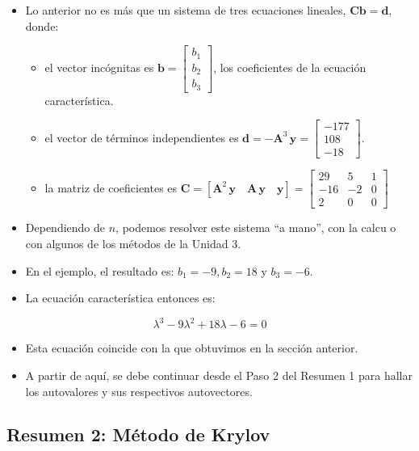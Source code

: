 \documentclass[openany]{book}
\providecommand{\tightlist}{%
  \setlength{\itemsep}{0pt}\setlength{\parskip}{0pt}}
\begin{document}
\begin{itemize}
\item
  Lo anterior no es más que un sistema de tres ecuaciones lineales, \(\mathbf{Cb=d}\), donde:

  \begin{itemize}
  \tightlist
  \item
    el vector incógnitas es \(\mathbf{b} = \begin{bmatrix} b_1 \\ b_2 \\ b_3 \end{bmatrix}\), los coeficientes de la ecuación característica.
  \item
    el vector de términos independientes es \(\mathbf{d} = - \mathbf{A}^3 \, \mathbf{y} = \begin{bmatrix} -177 \\ 108 \\ -18 \end{bmatrix}\).
  \item
    la matriz de coeficientes es \(\mathbf{C} = [\mathbf{A}^{2} \, \mathbf{y} \quad \mathbf{A} \, \mathbf{y} \quad \mathbf{y}] = \begin{bmatrix} 29 & 5 & 1 \\ -16 & -2 & 0 \\2 & 0 & 0 \end{bmatrix}\)
  \end{itemize}
\item
  Dependiendo de \(n\), podemos resolver este sistema ``a mano'', con la calcu o con algunos de los métodos de la Unidad 3.
\item
  En el ejemplo, el resultado es: \(b_1 = -9, b_2 = 18\) y \(b_3 = -6\).
\item
  La ecuación característica entonces es:
\end{itemize}

\[
\lambda^3 - 9 \lambda^2 + 18 \lambda - 6 = 0
\]

\begin{itemize}
\tightlist
\item
  Esta ecuación coincide con la que obtuvimos en la sección anterior.
\item
  A partir de aquí, se debe continuar desde el Paso 2 del Resumen 1 para hallar los autovalores y sus respectivos autovectores.
\end{itemize}

\hypertarget{resumen-2-muxe9todo-de-krylov}{%
\subsection{Resumen 2: Método de Krylov}\label{resumen-2-muxe9todo-de-krylov}}
\end{document}
